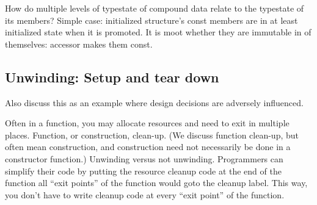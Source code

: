 \documentclass[10pt]{amsart}
\begin{document}
How do multiple levels of typestate of compound data relate to the
typestate of its members?  Simple case: initialized structure's const
members are in at least initialized state when it is promoted.  It is
moot whether they are immutable in of themselves: accessor makes them
const.


\subsection{Unwinding: Setup and tear down}

Also discuss this as an example where design decisions are adversely
influenced.

Often in a function, you may allocate resources and need to exit in
multiple places.  Function, or construction, clean-up.  (We discuss
function clean-up, but often mean construction, and construction need
not necessarily be done in a constructor function.)  Unwinding versus
not unwinding.  Programmers can simplify their code by putting the
resource cleanup code at the end of the function all ``exit points''
of the function would goto the cleanup label. This way, you don't have
to write cleanup code at every ``exit point'' of the function.



\end{document}
